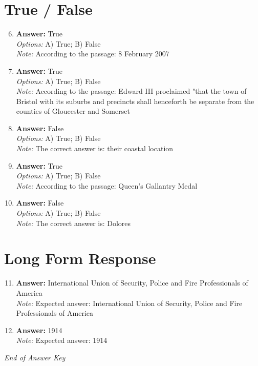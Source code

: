\documentclass[12pt]{article}
\begin{document}
\section*{True / False}
\begin{enumerate}[label=\arabic*.]
\setcounter{enumi}{5}
\item \textbf{Answer:} True
\\ \textit{Options:} A) True; B) False
\\ \textit{Note:} According to the passage: 8 February 2007
\item \textbf{Answer:} True
\\ \textit{Options:} A) True; B) False
\\ \textit{Note:} According to the passage: Edward III proclaimed "that the town of Bristol with its suburbs and precincts shall henceforth be separate from the counties of Gloucester and Somerset
\item \textbf{Answer:} False
\\ \textit{Options:} A) True; B) False
\\ \textit{Note:} The correct answer is: their coastal location
\item \textbf{Answer:} True
\\ \textit{Options:} A) True; B) False
\\ \textit{Note:} According to the passage: Queen's Gallantry Medal
\item \textbf{Answer:} False
\\ \textit{Options:} A) True; B) False
\\ \textit{Note:} The correct answer is: Dolores
\end{enumerate}

\section*{Long Form Response}
\begin{enumerate}[label=\arabic*.]
\setcounter{enumi}{10}
\item \textbf{Answer:} International Union of Security, Police and Fire Professionals of America
\\ \textit{Note:} Expected answer: International Union of Security, Police and Fire Professionals of America
\item \textbf{Answer:} 1914
\\ \textit{Note:} Expected answer: 1914
\end{enumerate}

\vfill
\noindent\textit{End of Answer Key}
\end{document}
